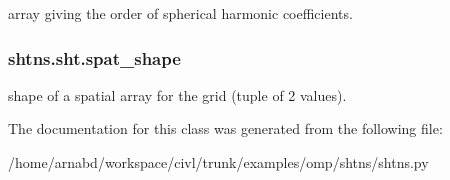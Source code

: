 array giving the order of spherical harmonic coefficients. 

\hypertarget{classshtns_1_1sht_a01ca7000347fa6ba02aefd04bb072030}{}
\subsubsection[{spat\+\_\+shape}]{\setlength{\rightskip}{0pt plus 5cm}shtns.\+sht.\+spat\+\_\+shape}\label{classshtns_1_1sht_a01ca7000347fa6ba02aefd04bb072030}


shape of a spatial array for the grid (tuple of 2 values). 



The documentation for this class was generated from the following file\+:\begin{DoxyCompactItemize}
\item 
/home/arnabd/workspace/civl/trunk/examples/omp/shtns/shtns.\+py\end{DoxyCompactItemize}
